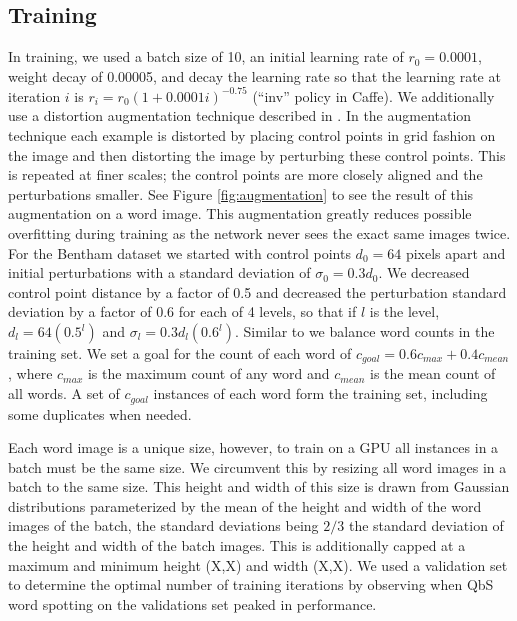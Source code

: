 \documentclass[ms,electronic,twosidetoc,letterpaper,chaptercenter,parttop,lol,lof,lot]{byumsphd}
\begin{document}
\subsection{Training}

In training, we used a batch size of 10, an initial learning rate of $r_0=0.0001$, weight decay of 0.00005, and decay the learning rate so that the learning rate at iteration $i$ is $r_i = r_0 (1 + 0.0001 i)^{-0.75}$ (``inv'' policy in Caffe). We additionally use a distortion augmentation technique described in \cite{wigington2017}. In the augmentation technique each example is distorted by placing control points in grid fashion on the image and then distorting the image by perturbing these control points. This is repeated at finer scales; the control points are more closely aligned and the perturbations smaller. See Figure \ref{fig:augmentation} to see the result of this augmentation on a word image. This augmentation greatly reduces possible overfitting during training as the network never sees the exact same images twice.
For the Bentham dataset we started with control points $d_0 = 64$ pixels apart and initial perturbations with a standard deviation of $\sigma_0 = 0.3 d_0$. We decreased control point distance by a factor of 0.5 and decreased the perturbation standard deviation by a factor of 0.6 for each of 4 levels, so that if $l$ is the level, $d_l = 64(0.5^{l})$ and $\sigma_l = 0.3 d_l (0.6^{l})$.
Similar to \citep{sudholt2016} we balance word counts in the training set. We set a goal for the count of each word of $c_{goal} = 0.6c_{max}+0.4c_{mean}$, where $c_{max}$ is the maximum count of any word and $c_{mean}$ is the mean count of all words. A set of $c_{goal}$ instances of each word form the training set, including some duplicates when needed.

Each word image is a unique size, however, to train on a GPU all instances in a batch must be the same size. We circumvent this by resizing all word images in a batch to the same size. This height and width of this size is drawn from Gaussian distributions parameterized by the mean of the height and width of
the word images of the batch, the standard deviations being $2/3$ the standard deviation of the height and width of the batch images. This is additionally capped at a maximum and minimum height (X,X) and width (X,X).
We used a validation set to determine the optimal number of training iterations by observing when QbS word spotting on the validations set peaked in performance.
\end{document}
